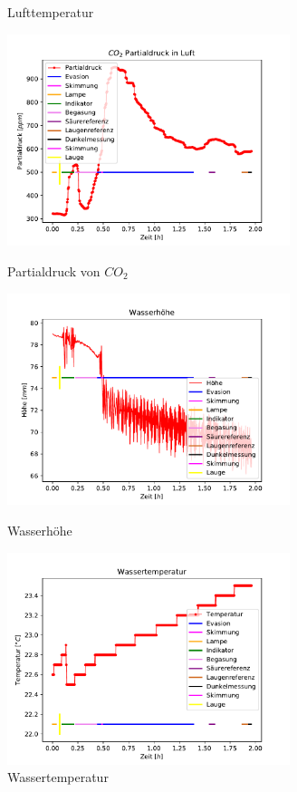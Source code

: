\documentclass[12pt]{article}
\begin{document}
\begin{figure}[H]
{		\caption{Lufttemperatur}
	}
	\hfill%
	\parbox{82.5mm}{
		\centering
		\includegraphics[width=82.5mm]{Meerwasser/Partialdruck}
		\caption{Partialdruck von $CO_2$}
	}
	\centering
	\parbox{82.5mm}{
		\centering
		\includegraphics[width=82.5mm]{Meerwasser/Wasserhoehe}
		\caption{Wasserh\"ohe }
	}
	\hfill%
	\parbox{82.5mm}{
		\centering
		\includegraphics[width=82.5mm]{Meerwasser/Wassertemperatur}
		\caption{Wassertemperatur }
	}
\end{figure}
\end{document}
